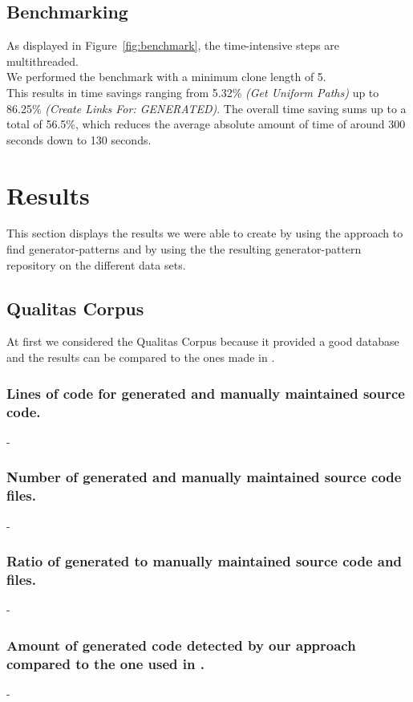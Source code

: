 \subsection{Benchmarking}
\label{section:benchmark}
As displayed in Figure~\ref{fig:benchmark}, the time-intensive steps are multithreaded.\\
We performed the benchmark with a minimum clone length of 5.\\
This results in time savings ranging from 5.32\% \textit{(Get Uniform Paths)} up to 86.25\% \textit{(Create Links For: GENERATED)}. The overall time saving sums up to a total of 56.5\%, which reduces the average absolute amount of time of around 300 seconds down to 130 seconds. 



\section{Results}
This section displays the results we were able to create by using the approach to find generator-patterns and by using the the resulting generator-pattern repository on the different data sets. 
\subsection{Qualitas Corpus}
At first we considered the Qualitas Corpus because it provided a good database and the results can be compared to the ones made in \cite{Bernwieser2014}.




\subsubsection{Lines of code for generated and manually maintained source code.}
- 
\subsubsection{Number of generated and manually maintained source code files.}
- 
\subsubsection{Ratio of generated to manually maintained source code and files.}
- 
\subsubsection{Amount of generated code detected by our approach compared to the one used in \cite{Bernwieser2014}.}
- 
